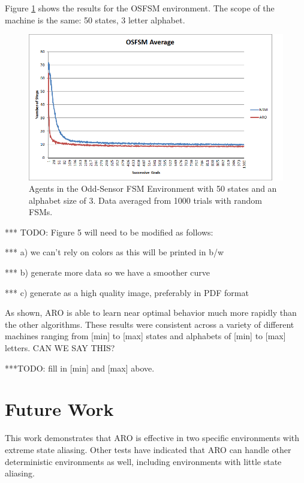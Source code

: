 \documentclass[letterpaper]{article} %
\begin{document}
Figure \ref{fig5} shows the results for the OSFSM environment.  The scope of
the machine is the same: 50 states, 3 letter alphabet.  

\begin{figure}[t]
  \centering
  \includegraphics[width=0.9\columnwidth]{OSFSMGraph.png} %
  \caption{Agents in the Odd-Sensor FSM Environment with 50 states and an alphabet size of 3. Data averaged from 1000 trials with random FSMs.}
  \label{fig5}
\end{figure}

*** TODO: Figure 5 will need to be modified as follows:

***    a) we can't rely on colors as this will be printed in b/w

***    b) generate more data so we have a smoother curve

***    c) generate as a high quality image, preferably in PDF format


As shown, ARO is able to learn near optimal behavior much more rapidly
than the other algorithms.  These results were consistent across a
variety of different machines ranging from [min] to [max] states and
alphabets of [min] to [max] letters. CAN WE SAY THIS?

***TODO:  fill in [min] and [max] above.

\section{Future Work}

This work demonstrates that ARO is effective in two specific
environments with extreme state aliasing. Other tests have indicated that ARO can handle other deterministic environments as well, including environments with little state aliasing.
\end{document}
